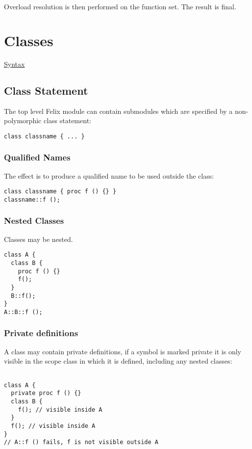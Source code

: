 \documentclass[oneside]{book}
\begin{document}
Overload resolution is then performed on the function set.
The result is final.

\chapter{Classes}
\href{http://felix-lang.org/share/lib/grammar/namespaces.fsyn}{Syntax}

\section{Class Statement}
The top level Felix module can contain submodules 
which are specified by a non-polymorphic class
statement:

\begin{verbatim}
class classname { ... }
\end{verbatim}

\subsection{Qualified Names}
The effect is to produce a qualified name to be used
outside the class:

\begin{verbatim}
class classname { proc f () {} }
classname::f (); 
\end{verbatim}

\subsection{Nested Classes}
Classes may be nested.

\begin{verbatim}
class A { 
  class B {
    proc f () {}
    f(); 
  }
  B::f();
}
A::B::f (); 
\end{verbatim}

\subsection{Private definitions}
A class may contain private definitions,
if a symbol is marked private it is only visible
in the scope class in which it is defined,
including any nested classes:


\begin{verbatim}

class A { 
  private proc f () {}
  class B {
    f(); // visible inside A 
  }
  f(); // visible inside A
}
// A::f () fails, f is not visible outside A
\end{verbatim}
\end{document}
